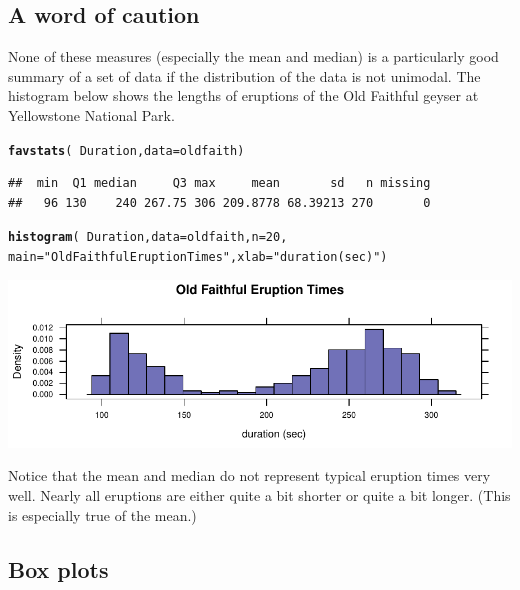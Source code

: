 \documentclass[twoside]{book}\usepackage[]{graphicx}\usepackage[]{xcolor}
\makeatletter
\def\maxwidth{ %
  \ifdim\Gin@nat@width>\linewidth
    \linewidth
  \else
    \Gin@nat@width
  \fi
}
\newcommand{\hlnum}[1]{\textcolor[rgb]{0.686,0.059,0.569}{#1}}%
\newcommand{\hlstr}[1]{\textcolor[rgb]{0.192,0.494,0.8}{#1}}%
\newcommand{\hlopt}[1]{\textcolor[rgb]{0,0,0}{#1}}%
\newcommand{\hlstd}[1]{\textcolor[rgb]{0.345,0.345,0.345}{#1}}%
\newcommand{\hlkwc}[1]{\textcolor[rgb]{0.333,0.667,0.333}{#1}}%
\newcommand{\hlkwd}[1]{\textcolor[rgb]{0.737,0.353,0.396}{\textbf{#1}}}%
\newenvironment{kframe}{%
 \def\at@end@of@kframe{}%
 \ifinner\ifhmode%
  \def\at@end@of@kframe{\end{minipage}}%
  \begin{minipage}{\columnwidth}%
 \fi\fi%
 \def\FrameCommand##1{\hskip\@totalleftmargin \hskip-\fboxsep
 \colorbox{shadecolor}{##1}\hskip-\fboxsep
     \hskip-\linewidth \hskip-\@totalleftmargin \hskip\columnwidth}%
 \MakeFramed {\advance\hsize-\width
   \@totalleftmargin\z@ \linewidth\hsize
   \@setminipage}}%
 {\par\unskip\endMakeFramed%
 \at@end@of@kframe}
\newenvironment{knitrout}{}{} %
\makeatother
\begin{document}
\subsection{A word of caution}
None of these measures (especially the mean and median) 
is a particularly good summary of a set of data if the distribution of the data is not unimodal.  
The histogram below shows the lengths of eruptions of the Old Faithful geyser
at Yellowstone National Park.
\begin{knitrout}
\color{fgcolor}\begin{kframe}
\begin{alltt}
\hlkwd{favstats}\hlstd{(}\hlopt{~} \hlstd{Duration,} \hlkwc{data}\hlstd{=oldfaith)}
\end{alltt}
\begin{verbatim}
##  min  Q1 median     Q3 max     mean       sd   n missing
##   96 130    240 267.75 306 209.8778 68.39213 270       0
\end{verbatim}
\begin{alltt}
\hlkwd{histogram}\hlstd{(} \hlopt{~} \hlstd{Duration,} \hlkwc{data}\hlstd{=oldfaith,}  \hlkwc{n}\hlstd{=}\hlnum{20}\hlstd{,}
        \hlkwc{main}\hlstd{=}\hlstr{"Old Faithful Eruption Times"}\hlstd{,} \hlkwc{xlab}\hlstd{=}\hlstr{"duration (sec)"}\hlstd{)}
\end{alltt}
\end{kframe}

{\centering \includegraphics[width=\maxwidth]{figures/fig-faithful-1} 

}



\end{knitrout}
Notice that the mean and median do not represent typical eruption times very well.  
Nearly all eruptions are either quite a bit shorter or quite a bit longer.  
(This is especially true of the mean.)


\subsection{Box plots}
\end{document}
